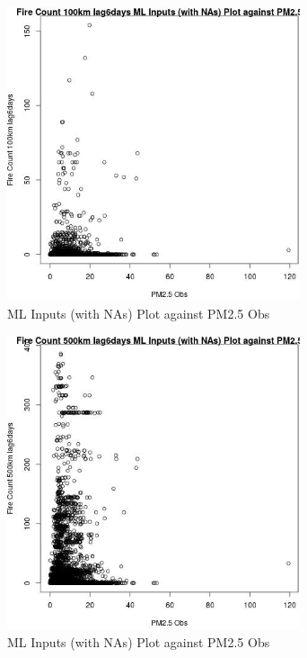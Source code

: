 \begin{figure} 
\centering  
\includegraphics[width=0.77\textwidth]{Code_Outputs/Report_ML_input_PM25_Step4_part_e_de_duplicated_aves_compiled_2019-05-18wNAs_Fire_Count_100km_lag6daysvPM25_Obs.jpg} 
\caption{\label{fig:Report_ML_input_PM25_Step4_part_e_de_duplicated_aves_compiled_2019-05-18wNAsFire_Count_100km_lag6daysvPM25_Obs}ML Inputs (with NAs) Plot against PM2.5 Obs} 
\end{figure} 
 

\begin{figure} 
\centering  
\includegraphics[width=0.77\textwidth]{Code_Outputs/Report_ML_input_PM25_Step4_part_e_de_duplicated_aves_compiled_2019-05-18wNAs_Fire_Count_500km_lag6daysvPM25_Obs.jpg} 
\caption{\label{fig:Report_ML_input_PM25_Step4_part_e_de_duplicated_aves_compiled_2019-05-18wNAsFire_Count_500km_lag6daysvPM25_Obs}ML Inputs (with NAs) Plot against PM2.5 Obs} 
\end{figure} 
 

